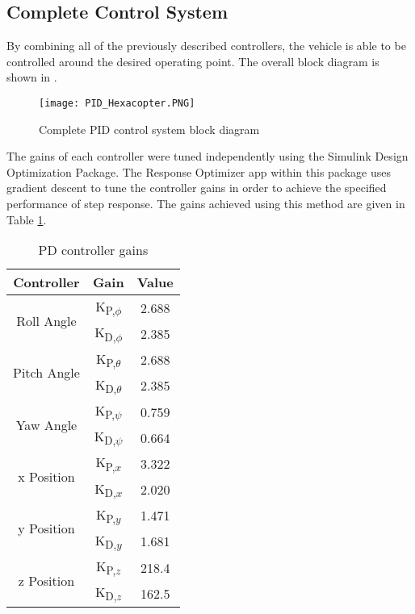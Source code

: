 \FloatBarrier
\subsection{Complete Control System}
By combining all of the previously described controllers, the vehicle is able to be controlled around the desired operating point. The overall block diagram is shown in . 
\begin{figure}[htb]
	\texttt{[image: PID\_Hexacopter.PNG]}%
	\caption{Complete PID control system block diagram}%
	\label{fig:PID_Hexacopter}%
\end{figure}

The gains of each controller were tuned independently using the Simulink Design Optimization Package. The Response Optimizer app within this package uses gradient descent to tune the controller gains in order to achieve the specified performance of step response. The gains achieved using this method are given in Table \ref{table:PID_Gains}.
\begin{table}[htb]\label{table:PID_Gains}
\begin{center}
\begin{tabular}{||c|c|c||} 
 \hline
 Controller & Gain & Value\\ [0.5ex] 
 \hline\hline
 \multirow{2}{7em}{Roll Angle}& K\textsubscript{P,$\phi$} & 2.688 \\ 
 \cline{2-3}
  &K\textsubscript{D,$\phi$} & 2.385 \\
 \hline
  \multirow{2}{7em}{Pitch Angle}& K\textsubscript{P,$\theta$} & 2.688 \\
 \cline{2-3}
  &K\textsubscript{D,$\theta$} & 2.385 \\
 \hline
 \multirow{2}{7em}{Yaw Angle}& K\textsubscript{P,$\psi$} & 0.759 \\
 \cline{2-3}
 &K\textsubscript{D,$\psi$} & 0.664 \\
 \hline
 \multirow{2}{7em}{x Position}& K\textsubscript{P,$x$} & 3.322 \\
 \cline{2-3}
 &K\textsubscript{D,$x$} & 2.020 \\
 \hline
 \multirow{2}{7em}{y Position}& K\textsubscript{P,$y$} & 1.471 \\
 \cline{2-3}
 &K\textsubscript{D,$y$} & 1.681 \\
 \hline
 \multirow{2}{7em}{z Position}& K\textsubscript{P,$z$} & 218.4 \\
 \cline{2-3}
 &K\textsubscript{D,$z$} & 162.5 \\
 \hline
\end{tabular}
\caption{PD controller gains}
\end{center}
\end{table}

